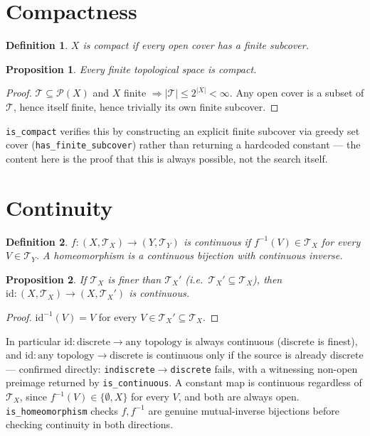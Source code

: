 \documentclass[11pt]{article}
\newtheorem{proposition}{Proposition}
\newtheorem{definition}{Definition}
\begin{document}
\section{Compactness}

\begin{definition}
$X$ is \emph{compact} if every open cover has a finite subcover.
\end{definition}

\begin{proposition}
Every finite topological space is compact.
\end{proposition}
\begin{proof}
$\mathcal T \subseteq \mathcal P(X)$ and $X$ finite $\Rightarrow |\mathcal T| \le
2^{|X|} < \infty$. Any open cover is a subset of $\mathcal T$, hence itself finite, hence
trivially its own finite subcover.
\end{proof}

\texttt{is\_compact} verifies this by constructing an explicit finite subcover via greedy
set cover (\texttt{has\_finite\_subcover}) rather than returning a hardcoded constant — the
content here is the proof that this is always possible, not the search itself.

\section{Continuity}

\begin{definition}
$f: (X,\mathcal T_X) \to (Y,\mathcal T_Y)$ is \emph{continuous} if $f^{-1}(V) \in
\mathcal T_X$ for every $V \in \mathcal T_Y$. A \emph{homeomorphism} is a continuous
bijection with continuous inverse.
\end{definition}

\begin{proposition}
If $\mathcal T_X$ is finer than $\mathcal T_X'$ (i.e.\ $\mathcal T_X' \subseteq
\mathcal T_X$), then $\mathrm{id}: (X,\mathcal T_X)\to(X,\mathcal T_X')$ is continuous.
\end{proposition}
\begin{proof}
$\mathrm{id}^{-1}(V) = V$ for every $V\in\mathcal T_X'\subseteq \mathcal T_X$.
\end{proof}

In particular $\mathrm{id}: \text{discrete} \to \text{any topology}$ is always continuous
(discrete is finest), and $\mathrm{id}:\text{any topology}\to\text{discrete}$ is continuous
only if the source is already discrete — confirmed directly:
\texttt{indiscrete}$\to$\texttt{discrete} fails, with a witnessing non-open preimage
returned by \texttt{is\_continuous}. A constant map is continuous regardless of
$\mathcal T_X$, since $f^{-1}(V) \in \{\emptyset, X\}$ for every $V$, and both are always
open. \texttt{is\_homeomorphism} checks $f,f^{-1}$ are genuine mutual-inverse bijections
before checking continuity in both directions.
\end{document}
